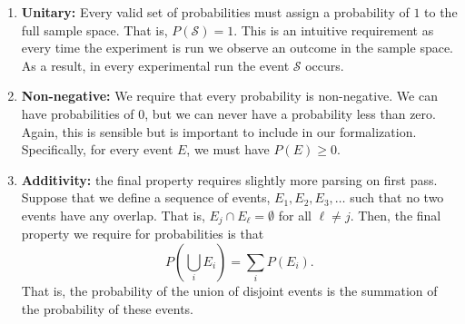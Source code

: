 \documentclass[
  letterpaper,
  DIV=11,
  numbers=noendperiod]{scrreprt}
\providecommand{\tightlist}{%
  \setlength{\itemsep}{0pt}\setlength{\parskip}{0pt}}\usepackage{longtable,booktabs,array}
\theoremstyle{definition}
\theoremstyle{definition}
\theoremstyle{definition}
\theoremstyle{remark}
\begin{document}
\begin{tcolorbox}[enhanced jigsaw, rightrule=.15mm, leftrule=.75mm, opacitybacktitle=0.6, title={The Axioms of Probability}, colframe=quarto-callout-tip-color-frame, opacityback=0, coltitle=black, breakable, toptitle=1mm, colbacktitle=quarto-callout-tip-color!10!white, bottomtitle=1mm, titlerule=0mm, arc=.35mm, colback=white, toprule=.15mm, left=2mm, bottomrule=.15mm]

\begin{enumerate}
\def\labelenumi{\arabic{enumi}.}
\tightlist
\item
  \textbf{Unitary:} Every valid set of probabilities must assign a
  probability of \(1\) to the full sample space. That is,
  \(P(\mathcal{S}) = 1\). This is an intuitive requirement as every time
  the experiment is run we observe an outcome in the sample space. As a
  result, in every experimental run the event \(\mathcal{S}\) occurs.
\item
  \textbf{Non-negative:} We require that every probability is
  non-negative. We can have probabilities of \(0\), but we can never
  have a probability less than zero. Again, this is
  sensible\footnotemark{} but is important to include in our
  formalization. Specifically, for every event \(E\), we must have
  \(P(E) \geq 0\).
\item
  \textbf{Additivity:} the final property requires slightly more parsing
  on first pass. Suppose that we define a sequence of events,
  \(E_1, E_2, E_3, \dots\) such that no two events have any overlap.
  That is, \(E_j \cap E_\ell = \emptyset\) for all \(\ell\neq j\). Then,
  the final property we require for probabilities is that
  \[P\left(\bigcup_i E_i\right) = \sum_i P(E_i).\] That is, the
  probability of the union of disjoint events is the summation of the
  probability of these events.
\end{enumerate}

\end{tcolorbox}

\end{document}
